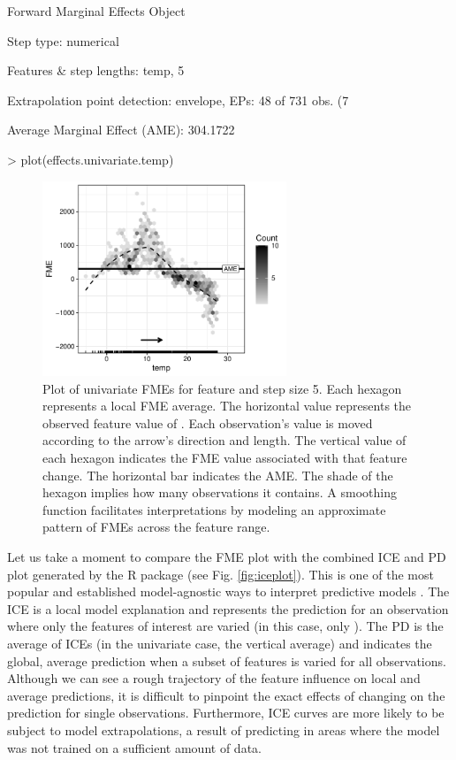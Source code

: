 \begin{example}
Forward Marginal Effects Object

Step type:
  numerical

Features & step lengths:
  temp, 5

Extrapolation point detection:
  envelope, EPs: 48 of 731 obs. (7 %

Average Marginal Effect (AME):
  304.1722
 
> plot(effects.univariate.temp)
\end{example}
\begin{figure}[H]
    \centering
    \includegraphics[width = 0.65\textwidth]{figures/univariate_fme_plot_temp.pdf}
    \caption{Plot of univariate FMEs for feature  and step size 5. Each hexagon represents a local FME average. The horizontal value represents the observed feature value of . Each observation's  value is moved according to the arrow's direction and length. The vertical value of each hexagon indicates the FME value associated with that feature change. The horizontal bar indicates the AME. The shade of the hexagon implies how many observations it contains. A smoothing function facilitates interpretations by modeling an approximate pattern of FMEs across the feature range.}
    \label{fig:univariate_fme_plot_temp}
\end{figure}
\par
Let us take a moment to compare the FME plot with the combined ICE and PD plot generated by the R package  \citep{molnar_imlpackage} (see Fig. \ref{fig:iceplot}).
This is one of the most popular and established model-agnostic ways to interpret predictive models \citep{molnar_iml}. The ICE is a local model explanation and represents the prediction for an observation where only the features of interest are varied (in this case, only ). The PD is the average of ICEs (in the univariate case, the vertical average) and indicates the global, average prediction when a subset of features is varied for all observations. 
Although we can see a rough trajectory of the feature influence on local and average predictions, it is difficult to pinpoint the exact effects of changing  on the prediction for single observations. Furthermore, ICE curves are more likely to be subject to model extrapolations, a result of predicting in areas where the model was not trained on a sufficient amount of data.


